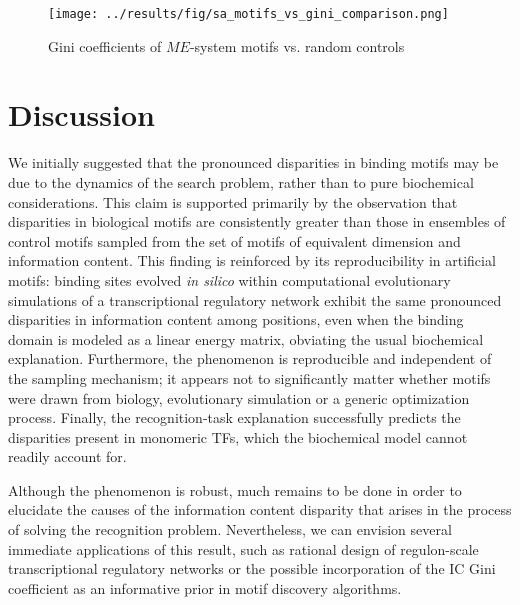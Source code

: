 \documentclass{article}
\begin{document}
\begin{figure}[ht]
  \centering
  \texttt{[image: ../results/fig/sa\_motifs\_vs\_gini\_comparison.png]}
  \caption{Gini coefficients of $ME$-system motifs vs. random controls}
  \label{fig:sa_motifs_vs_gini_comparison}
\end{figure}

\section{Discussion}

We initially suggested that the pronounced disparities in binding
motifs may be due to the dynamics of the search problem, rather than
to pure biochemical considerations.  This claim is supported primarily
by the observation that disparities in biological motifs are
consistently greater than those in ensembles of control motifs sampled
from the set of motifs of equivalent dimension and information
content.  This finding is reinforced by its reproducibility in
artificial motifs: binding sites evolved \textit{in silico} within
computational evolutionary simulations of a transcriptional regulatory
network exhibit the same pronounced disparities in information content
among positions, even when the binding domain is modeled as a linear
energy matrix, obviating the usual biochemical explanation.
Furthermore, the phenomenon is reproducible and independent of the sampling
mechanism; it appears not to significantly matter whether motifs were
drawn from biology, evolutionary simulation or a generic optimization
process.  Finally, the recognition-task explanation successfully
predicts the disparities present in monomeric TFs, which the
biochemical model cannot readily account for.

Although the phenomenon is robust, much remains to be done in order to
elucidate the causes of the information content disparity that arises
in the process of solving the recognition problem.  Nevertheless, we
can envision several immediate applications of this result, such as
rational design of regulon-scale transcriptional regulatory networks
or the possible incorporation of the IC Gini coefficient as an
informative prior in motif discovery algorithms.
\end{document}

